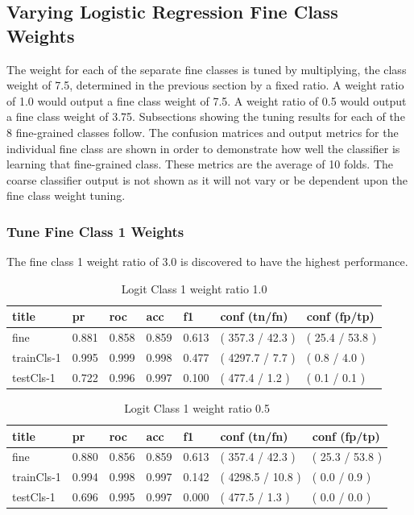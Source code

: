 \documentclass[ms]{nuthesis}
\begin{document}
\subsection{Varying Logistic Regression Fine Class Weights}
\par The weight for each of the separate fine classes is tuned by multiplying,
the class weight of 7.5, determined in the previous section by a fixed ratio. A
weight ratio of 1.0 would output a fine class weight of 7.5. A weight ratio of
 0.5 would output a fine class weight of 3.75. Subsections showing the tuning results
 for each of the 8 fine-grained classes follow. The confusion matrices and output metrics for the individual
 fine class are shown in order to demonstrate how well the classifier is learning that
 fine-grained class. These metrics are the average of 10 folds. The coarse classifier output
 is not shown as it will not vary or be dependent upon the fine class weight tuning.

\subsubsection{Tune Fine Class 1 Weights}
\par The fine class 1 weight ratio of 3.0 is discovered to have the highest performance.
\FloatBarrier
\begin{table}[H]
\centering
\caption{Logit Class 1 weight ratio 1.0}
\label{tab:LogRegCls1-Wt1}
\begin{tabular}{|l||l||l||l||l||l||l|}\toprule
title & pr & roc & acc & f1 & conf (tn/fn) & conf (fp/tp) \\ \midrule
fine & 0.881 & 0.858 & 0.859 & 0.613 & ( 357.3 / 42.3 ) & ( 25.4 / 53.8 ) \\
trainCls-1 & 0.995 & 0.999 & 0.998 & 0.477 & ( 4297.7 / 7.7 ) & ( 0.8 / 4.0 ) \\
testCls-1 & 0.722 & 0.996 & 0.997 & 0.100 & ( 477.4 / 1.2 ) & ( 0.1 / 0.1 ) \\ \bottomrule
\end{tabular}
\end{table}
\FloatBarrier


\FloatBarrier
\begin{table}[H]
\centering
\caption{Logit Class 1 weight ratio 0.5}
\label{tab:LogRegCls1-Wtp5}
\begin{tabular}{|l||l||l||l||l||l||l|}\toprule
title & pr & roc & acc & f1 & conf (tn/fn) & conf (fp/tp) \\ \midrule
fine & 0.880 & 0.856 & 0.859 & 0.613 & ( 357.4 / 42.3 ) & ( 25.3 / 53.8 ) \\
trainCls-1 & 0.994 & 0.998 & 0.997 & 0.142 & ( 4298.5 / 10.8 ) & ( 0.0 / 0.9 ) \\
testCls-1 & 0.696 & 0.995 & 0.997 & 0.000 & ( 477.5 / 1.3 ) & ( 0.0 / 0.0 ) \\ \bottomrule
\end{tabular}
\end{table}
\FloatBarrier
\end{document}
